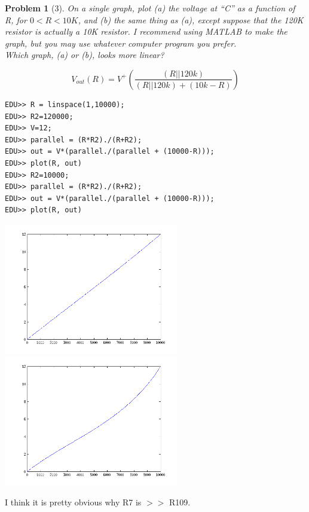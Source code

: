 \documentclass[12pt]{article}
\newtheorem*{prob}{Problem}
\begin{document}
\begin{prob}[3]{
  On a single graph, plot (a) the voltage at ``C'' as a function of R, for $0 < R < 10K$, and (b) the same thing as (a), except suppose that the 120K resistor is actually a 10K resistor. I recommend using MATLAB to make the graph, but you may use whatever computer program you prefer.\\ Which graph, (a) or (b), looks more linear?
}\end{prob}
\[V_{out}(R) = V^+ \left(\frac{(R||120k)}{(R||120k)+(10k-R)}\right)\]
\begin{verbatim}
EDU>> R = linspace(1,10000);
EDU>> R2=120000;
EDU>> V=12;
EDU>> parallel = (R*R2)./(R+R2);
EDU>> out = V*(parallel./(parallel + (10000-R)));
EDU>> plot(R, out)
EDU>> R2=10000;
EDU>> parallel = (R*R2)./(R+R2);
EDU>> out = V*(parallel./(parallel + (10000-R)));
EDU>> plot(R, out)
\end{verbatim}
\begin{center}
  \includegraphics[width=3in]{r2is120k.png}
  \includegraphics[width=3in]{r2is10k.png}
\end{center}
I think it is pretty obvious why R7 is $>>$ R109.
\end{document}
